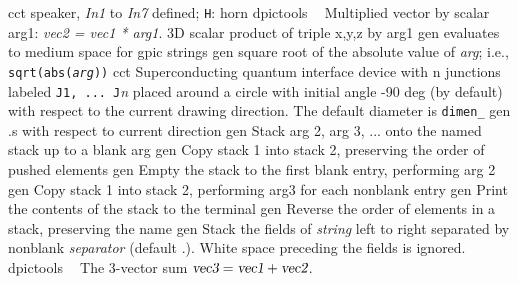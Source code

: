 %
  {cct}%
  {speaker, {\sl In1} to {\sl In7} defined; {\tt H}: horn
   }%
%
  {dpictools}%
  {$\;\;$ Multiplied vector by scalar arg1: {\sl vec2 = vec1 * arg1}.}%
%
  {3D} {scalar product of triple x,y,z by arg1}%
%
  {gen}%
  {evaluates to medium space for gpic strings}%
%
  {gen}%
  {square root of the absolute value of {\sl arg}; i.e.,
   {\tt sqrt(abs({\sl arg}))}}%
%
  {cct}%
  {Superconducting quantum interface device
   with {\sl }n junctions labeled {\tt J1, ... J}{\sl n} placed around
   a circle with initial angle -90 deg (by default) with respect to the
   current drawing direction. The default diameter is {\tt dimen\_} }%
%
  {gen}%
  {.s with respect to current direction}%
%
  {gen}%
  {Stack arg 2, arg 3, ... onto the named stack up to a blank arg}%
%
  {gen}%
  {Copy stack 1 into stack 2, preserving the order of pushed
  elements}%
%
  {gen}%
  {Empty the stack to the first blank entry, performing arg 2}%
%
  {gen}%
  {Copy stack 1 into stack 2, performing arg3 for each nonblank
  entry}%
%
  {gen}%
  {Print the contents of the stack to the terminal}%
%
  {gen}%
  {Reverse the order of elements in a stack, preserving the name}%
%
  {gen}%
  {Stack the fields of {\sl string} left to right separated
  by nonblank
    {\sl separator} (default .).  White space preceding the fields
    is ignored.}%
%
  {dpictools}%
  {$\;\;$ The 3-vector sum
    $\hbox{\sl vec3} = \hbox{\sl vec1} + \hbox{\sl vec2}$.}%
